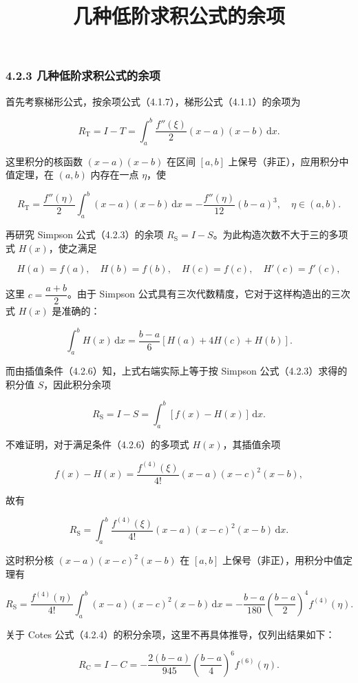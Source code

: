 \documentclass[
  10pt,
  fontset=fandol]{ctexart}
\title{几种低阶求积公式的余项}
\author{}
\date{}
\begin{document}
\maketitle

\subsubsection{4.2.3 几种低阶求积公式的余项}\label{ux51e0ux79cdux4f4eux9636ux6c42ux79efux516cux5f0fux7684ux4f59ux9879}

首先考察梯形公式，按余项公式（4.1.7），梯形公式（4.1.1）的余项为

\[
R_{\mathrm{T}}=I-T=\int_a^b\frac{f''(\xi)}2(x-a)(x-b)\,\mathrm{d}x.
\]

这里积分的核函数 \((x-a)(x-b)\) 在区间 \([a,b]\) 上保号（非正），应用积分中值定理，在 \((a,b)\) 内存在一点 \(\eta\)，使

\[
R_{\mathrm{T}}=\frac{f''(\eta)}2\int_a^b(x-a)(x-b)\,\mathrm{d}x
=-\frac{f''(\eta)}{12}(b-a)^3,\quad\eta\in(a,b).
\tag{4.2.5}
\]

再研究 Simpson 公式（4.2.3）的余项 \(R_{\mathrm{S}}=I-S\)。为此构造次数不大于三的多项式 \(H(x)\)，使之满足

\[
H(a)=f(a),\quad H(b)=f(b),\quad H(c)=f(c),\quad H'(c)=f'(c),
\tag{4.2.6}
\]

这里 \(c=\dfrac{a+b}{2}\)。由于 Simpson 公式具有三次代数精度，它对于这样构造出的三次式 \(H(x)\) 是准确的：

\[
\int_a^b H(x)\,\mathrm{d}x=\frac{b-a}{6}[H(a)+4H(c)+H(b)].
\]

而由插值条件（4.2.6）知，上式右端实际上等于按 Simpson 公式（4.2.3）求得的积分值 \(S\)，因此积分余项

\[
R_{\mathrm{S}}=I-S=\int_a^b[f(x)-H(x)]\,\mathrm{d}x.
\]

不难证明，对于满足条件（4.2.6）的多项式 \(H(x)\)，其插值余项

\[
f(x)-H(x)=\frac{f^{(4)}(\xi)}{4!}(x-a)(x-c)^2(x-b),
\]

故有

\[
R_{\mathrm{S}}=\int_a^b\frac{f^{(4)}(\xi)}{4!}(x-a)(x-c)^2(x-b)\,\mathrm{d}x.
\]

这时积分核 \((x-a)(x-c)^2(x-b)\) 在 \([a,b]\) 上保号（非正），用积分中值定理有

\[
R_{\mathrm{S}}=\frac{f^{(4)}(\eta)}{4!}\int_a^b(x-a)(x-c)^2(x-b)\,\mathrm{d}x
=-\frac{b-a}{180}\left(\frac{b-a}{2}\right)^4f^{(4)}(\eta).
\tag{4.2.7}
\]

关于 Cotes 公式（4.2.4）的积分余项，这里不再具体推导，仅列出结果如下：

\[
R_{\mathrm{C}}=I-C=-\frac{2(b-a)}{945}\left(\frac{b-a}{4}\right)^6f^{(6)}(\eta).
\tag{4.2.8}
\]
\end{document}
